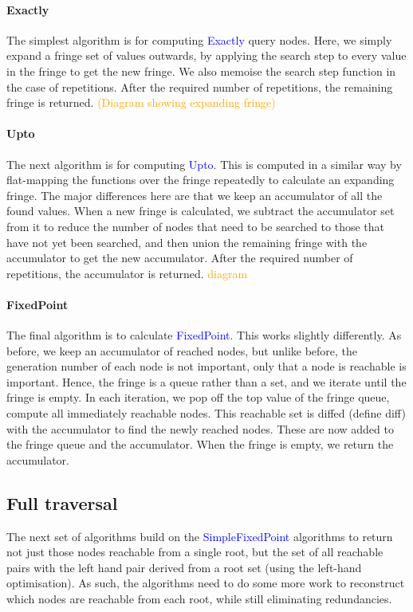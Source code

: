 \documentclass[12pt,a4paper,twoside,openright]{report}
\newcommand\codeName[1]{\textcolor{blue}{#1}}
\newcommand\diagramNeeded[1]{\textcolor{orange}{#1}}
\begin{document}
{{		\paragraph{Exactly}
The simplest algorithm is for computing \codeName{Exactly} query nodes. Here, we simply expand a fringe set of values outwards, by applying the search step to every value in the fringe to get the new fringe. We also memoise the search step function in the case of repetitions. After the required number of repetitions, the remaining fringe is returned. \diagramNeeded{(Diagram showing expanding fringe)}
    
    		\paragraph{Upto}
The next algorithm is for computing \codeName{Upto}. This is computed in a similar way by flat-mapping the functions over the fringe repeatedly to calculate an expanding fringe. The major differences here are that we keep an accumulator of all the found values. When a new fringe is calculated, we subtract the accumulator set from it to reduce the number of nodes that need to be searched to those that have not yet been searched, and then union the remaining fringe with the accumulator to get the new accumulator. After the required number of repetitions, the accumulator is returned. \diagramNeeded{diagram}
	
		\paragraph{FixedPoint}
The  final algorithm is to calculate \codeName{FixedPoint}. This works slightly differently. As before, we keep an accumulator of reached nodes, but unlike before, the generation number of each node is not important, only that a node is reachable is important. Hence, the fringe is a queue rather than a set, and we iterate until the fringe is empty. In each iteration, we pop off the top value of the fringe queue, compute all immediately reachable nodes. This reachable set is diffed (define diff) with the accumulator to find the newly reached nodes. These are now added to the fringe queue and the accumulator. When the fringe is empty, we return the accumulator.
	
	\subsection{Full traversal}
		The next set of algorithms build on the \codeName{SimpleFixedPoint} algorithms to return not just those nodes reachable from a single root, but the set of all reachable pairs with the left hand pair derived from a root set (using the left-hand optimisation). As such, the algorithms need to do some more work to reconstruct which nodes are reachable from each root, while still eliminating redundancies.
}}
\end{document}
